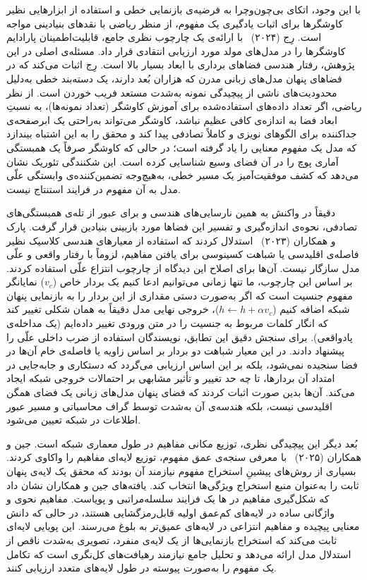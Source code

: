 با این وجود، اتکای بی‌چون‌وچرا به فرضیه‌ی بازنمایی خطی و استفاده از ابزارهایی نظیر کاوشگرها برای اثبات یادگیری یک مفهوم، از منظر ریاضی با نقدهای بنیادینی مواجه است. رِج (۲۰۲۴)~\cite{rege2024probe} با ارائه‌ی یک چارچوب نظری جامع، قابلیت‌اطمینان پارادایم کاوشگرها را در مدل‌های مولد مورد ارزیابی انتقادی قرار داد. مسئله‌ی اصلی در این پژوهش، رفتار هندسی فضاهای برداری با ابعاد بسیار بالا است. رِج اثبات می‌کند که در فضاهای پنهان مدل‌های زبانی مدرن که هزاران بُعد دارند، یک دسته‌بند خطی به‌دلیل محدودیت‌های ناشی از پیچیدگی نمونه به‌شدت مستعد فریب خوردن است. از نظر ریاضی، اگر تعداد داده‌های استفاده‌شده برای آموزش کاوشگر (تعداد نمونه‌ها)، به نسبتِ ابعاد فضا به اندازه‌ی کافی عظیم نباشد، کاوشگر می‌تواند به‌راحتی یک ابرصفحه‌ی جداکننده برای الگوهای نویزی و کاملاً تصادفی پیدا کند و محقق را به این اشتباه بیندازد که مدل یک مفهوم معنایی را یاد گرفته است؛ در حالی که کاوشگر صرفاً یک همبستگی آماری پوچ را در آن فضای وسیع شناسایی کرده است. این شکنندگی تئوریک نشان می‌دهد که کشف موفقیت‌آمیز یک مسیر خطی، به‌هیچ‌وجه تضمین‌کننده‌ی وابستگی علّی مدل به آن مفهوم در فرایند استنتاج نیست.

دقیقاً در واکنش به همین نارسایی‌های هندسی و برای عبور از تله‌ی همبستگی‌های تصادفی، نحوه‌ی اندازه‌گیری و تفسیر این فضاها مورد بازبینی بنیادین قرار گرفت. پارک و همکاران (۲۰۲۳)~\cite{park2023thelinear} استدلال کردند که استفاده از معیارهای هندسی کلاسیک نظیر فاصله‌ی اقلیدسی یا شباهت کسینوسی برای یافتن مفاهیم، لزوماً با رفتار واقعی و علّی مدل سازگار نیست. آن‌ها برای اصلاح این دیدگاه از چارچوب انتزاع علّی استفاده کردند. بر اساس این چارچوب، ما تنها زمانی می‌توانیم ادعا کنیم یک بردار خاص ($v_c$) نمایانگر مفهوم جنسیت است که اگر به‌صورت دستی مقداری از این بردار را به بازنمایی پنهان شبکه اضافه کنیم ($h \leftarrow h + \alpha v_c$)، خروجی نهایی مدل دقیقاً به همان شکلی تغییر کند که انگار کلمات مربوط به جنسیت را در متن ورودی تغییر داده‌ایم (یک مداخله‌ی پادواقعی). برای سنجش دقیق این تطابق، نویسندگان استفاده از ضرب داخلی علّی را پیشنهاد دادند. در این معیار شباهت دو بردار بر اساس زاویه یا فاصله‌ی خام آن‌ها در فضا سنجیده نمی‌شود، بلکه بر این اساس ارزیابی می‌گردد که دستکاری و جابه‌جایی در امتداد آن بردارها، تا چه حد تغییر و تأثیر مشابهی بر احتمالات خروجی شبکه ایجاد می‌کند. آن‌ها بدین صورت اثبات کردند که فضای پنهان مدل‌های زبانی یک فضای همگن اقلیدسی نیست، بلکه هندسه‌ی آن به‌شدت توسط گراف محاسباتی و مسیر عبور اطلاعات در شبکه تعیین می‌شود.

بُعد دیگر این پیچیدگی نظری، توزیع مکانی مفاهیم در طول معماری شبکه است. جین و همکاران (۲۰۲۵)~\cite{jin2025exploring} با معرفی سنجه‌ی عمق مفهوم، توزیع لایه‌ای مفاهیم را واکاوی کردند. بسیاری از روش‌های پیشینِ استخراج مفهوم نیازمند آن بودند که محقق یک لایه‌ی پنهان ثابت را به‌عنوان منبع استخراج ویژگی‌ها انتخاب کند. یافته‌های جین و همکاران نشان داد که شکل‌گیری مفاهیم در ها یک فرایند سلسله‌مراتبی و پویاست. مفاهیم نحوی و واژگانی ساده در لایه‌های کم‌عمق اولیه قابل‌رمزگشایی هستند، در حالی که دانش معنایی پیچیده و مفاهیم انتزاعی در لایه‌های عمیق‌تر به بلوغ می‌رسند. این پویایی لایه‌ای ثابت می‌کند که استخراج بازنمایی‌ها از یک لایه‌ی منفرد، تصویری به‌شدت ناقص از استدلال مدل ارائه می‌دهد و تحلیل جامع نیازمند رهیافت‌های کل‌نگری است که تکامل یک مفهوم را به‌صورت پیوسته در طول لایه‌های متعدد ارزیابی کنند.

